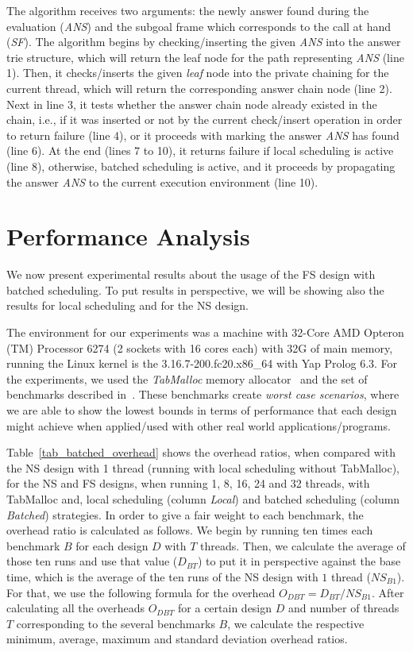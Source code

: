 \documentclass{llncs}
\begin{document}
The algorithm receives two arguments: the newly answer found during
the evaluation (\emph{ANS}) and the subgoal frame which corresponds to
the call at hand (\emph{SF}). The algorithm begins by
checking/inserting the given \emph{ANS} into the answer trie
structure, which will return the leaf node for the path representing
\emph{ANS} (line 1). Then, it checks/inserts the given \emph{leaf}
node into the private chaining for the current thread, which will
return the corresponding answer chain node (line 2). Next in line 3,
it tests whether the answer chain node already existed in the chain,
i.e., if it was inserted or not by the current check/insert operation
in order to return failure (line 4), or it proceeds with marking the
answer \emph{ANS} has found (line 6). At the end (lines 7 to 10), it
returns failure if local scheduling is active (line 8), otherwise,
batched scheduling is active, and it proceeds by propagating the
answer \emph{ANS} to the current execution environment (line 10).


\section{Performance Analysis}

We now present experimental results about the usage of the FS design
with batched scheduling. To put results in perspective, we will be
showing also the results for local scheduling and for the NS
design.

The environment for our experiments was a machine with 32-Core AMD
Opteron (TM) Processor 6274 (2 sockets with 16 cores each) with 32G of
main memory, running the Linux kernel is the 3.16.7-200.fc20.x86\_64
with Yap Prolog 6.3. For the experiments, we used the \emph{TabMalloc}
memory allocator~\cite{Areias-12b} and the set of benchmarks described
in~\cite{Areias-12b}. These benchmarks create \emph{worst case
  scenarios}, where we are able to show the lowest bounds in terms of
performance that each design might achieve when applied/used with
other real world applications/programs.

Table~\ref{tab_batched_overhead} shows the overhead ratios, when
compared with the NS design with 1 thread (running with local
scheduling without TabMalloc), for the NS and FS designs, when running
1, 8, 16, 24 and 32 threads, with TabMalloc and, local scheduling
(column \emph{Local}) and batched scheduling (column \emph{Batched})
strategies. In order to give a fair weight to each benchmark, the
overhead ratio is calculated as follows. We begin by running ten times
each benchmark $B$ for each design $D$ with $T$ threads. Then, we
calculate the average of those ten runs and use that value ($D_{BT}$)
to put it in perspective against the base time, which is the average
of the ten runs of the NS design with $1$ thread ($NS_{B1}$). For
that, we use the following formula for the overhead $O_{DBT} = D_{BT}
/ NS_{B1}$. After calculating all the overheads $O_{DBT}$ for a
certain design $D$ and number of threads $T$ corresponding to the
several benchmarks $B$, we calculate the respective minimum, average,
maximum and standard deviation overhead ratios.
\end{document}
